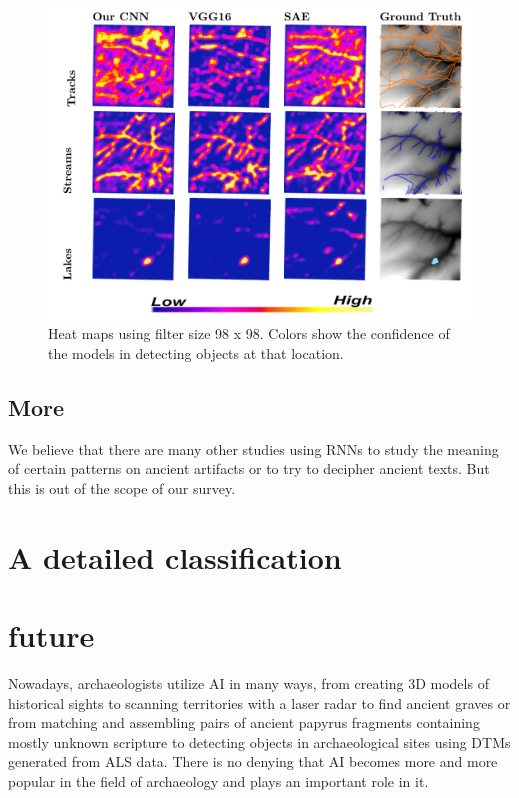 \documentclass[journal]{IEEEtran}
\begin{document}
	  \begin{figure}[htbp]
		\centering
		\includegraphics[width=1.0\linewidth]{./picture/fig8.png}
		\caption{Heat maps using filter size 98 x 98. Colors show the confidence of the models in detecting
		objects at that location.}
	  \end{figure}

	\subsection{More}

	We believe that there are many other studies using RNNs to study the meaning of certain patterns on ancient artifacts or to try to decipher ancient texts.
	But this is out of the scope of our survey.
	
	\section{A detailed classification}
	


	\section{future}

	Nowadays, archaeologists utilize AI in many ways, from creating 3D models of historical sights
	to scanning territories with a laser radar to find ancient graves or from matching and
	assembling pairs of ancient papyrus fragments containing mostly unknown scripture to detecting
	objects in archaeological sites using DTMs generated from ALS data. There is no denying that 
	AI becomes more and more popular in the field of archaeology and plays an important role in it.
\end{document}
